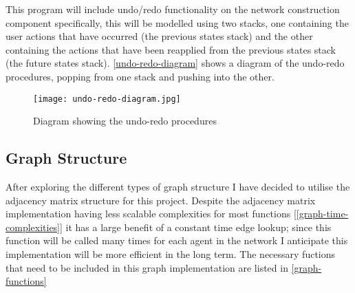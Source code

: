     This program will include undo/redo functionality on the network construction component specifically, this will be modelled using two stacks, one containing the user actions that have occurred (the previous states stack) and the other containing the actions that have been reapplied from the previous states stack (the future states stack). \autoref{undo-redo-diagram} shows a diagram of the undo-redo procedures, popping from one stack and pushing into the other.

    \begin{figure}
        \centering
        \texttt{[image: undo-redo-diagram.jpg]}
        \caption{Diagram showing the undo-redo procedures}
        \label{undo-redo-diagram}
    \end{figure}

    \subsection{Graph Structure}

        After exploring the different types of graph structure I have decided to utilise the adjacency matrix structure for this project. Despite the adjacency matrix implementation having less scalable complexities for most functions [\autoref{graph-time-complexities}] it has a large benefit of a constant time edge lookup; since this function will be called many times for each agent in the network I anticipate this implementation will be more efficient in the long term. The necessary fuctions that need to be included in this graph implementation are listed in \autoref{graph-functions}

